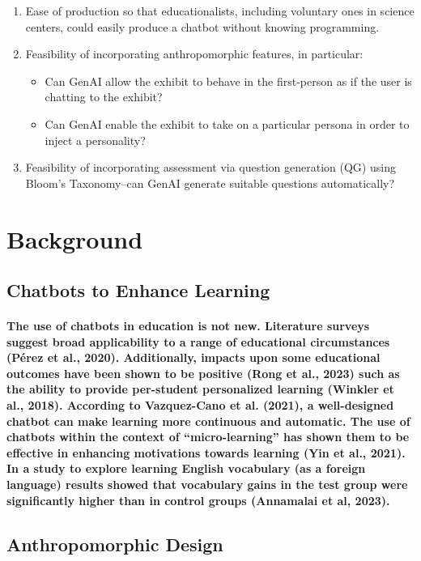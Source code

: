 \documentclass{article}
\begin{document}
\begin{enumerate}
    \item Ease of production so that educationalists, including voluntary ones in science centers, could easily produce a chatbot without knowing programming.
    \item Feasibility of incorporating anthropomorphic features, in particular:
    \begin{itemize}
        \item Can GenAI allow the exhibit to behave in the first-person as if the user is chatting to the exhibit?
        \item Can GenAI enable the exhibit to take on a particular persona in order to inject a personality?
    \end{itemize}
    \item Feasibility of incorporating assessment via question generation (QG) using Bloom’s Taxonomy–can GenAI generate suitable questions automatically?
\end{enumerate}

\section*{Background}

\subsection*{Chatbots to Enhance Learning}

\paragraph{The use of chatbots in education is not new. Literature surveys suggest broad applicability to a range of educational circumstances (Pérez et al., 2020). Additionally, impacts upon some educational outcomes have been shown to be positive (Rong et al., 2023) such as the ability to provide per-student personalized learning (Winkler et al., 2018). According to Vazquez-Cano et al. (2021), a well-designed chatbot can make learning more continuous and automatic. The use of chatbots within the context of “micro-learning” has shown them to be effective in enhancing motivations towards learning (Yin et al., 2021). In a study to explore learning English vocabulary (as a foreign language) results showed that vocabulary gains in the test group were significantly higher than in control groups (Annamalai et al, 2023).}

\subsection*{Anthropomorphic Design}
\end{document}

